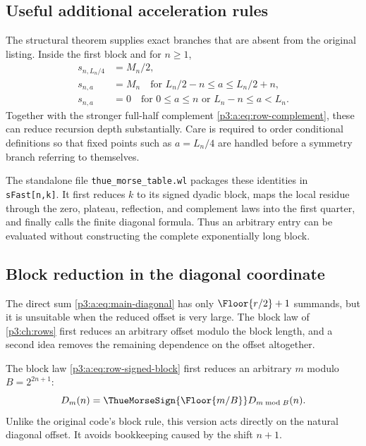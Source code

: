 \documentclass[11pt,oneside]{article}
\numberwithin{equation}{section}
\theoremstyle{definition}
\theoremstyle{remark}
\begin{document}
\subsection{Useful additional acceleration rules}

The structural theorem supplies exact branches that are absent from the
original listing.  Inside the first block and for \(n\ge1\),
\begin{align}
 s_{n,L_n/4}&=M_n/2,
 \label{p3:a:eq:wl-quarter-rule}\\
 s_{n,a}&=M_n
 \quad\text{for }L_n/2-n\le a\le L_n/2+n,
 \label{p3:a:eq:wl-plateau-rule}\\
 s_{n,a}&=0
 \quad\text{for }0\le a\le n
 \text{ or }L_n-n\le a<L_n.
 \label{p3:a:eq:wl-zero-rule}
\end{align}
Together with the stronger full-half complement
\eqref{p3:a:eq:row-complement}, these can reduce recursion depth substantially.
Care is required to order conditional definitions so that fixed points such as
\(a=L_n/4\) are handled before a symmetry branch referring to themselves.

The standalone file \texttt{thue\_morse\_table.wl} packages these identities in
\texttt{sFast[n,k]}.  It first reduces \(k\) to its signed dyadic block, maps the
local residue through the zero, plateau, reflection, and complement laws into the
first quarter, and finally calls the finite diagonal formula.  Thus an arbitrary
entry can be evaluated without constructing the complete exponentially long block.

\subsection{Block reduction in the diagonal coordinate}
The direct sum \eqref{p3:a:eq:main-diagonal} has only $\Floor{r/2}+1$
summands, but it is unsuitable when the reduced offset is very large. The
block law of \cref{p3:ch:rows} first reduces an arbitrary offset modulo the
block length, and a second idea removes the remaining dependence on the
offset altogether.

The block law \eqref{p3:a:eq:row-signed-block} first reduces an arbitrary $m$ modulo
$B=2^{2n+1}$:
\begin{equation}
 D_m(n)=\ThueMorseSign{\Floor{m/B}}D_{m\bmod B}(n).
 \label{p3:b:eq:diagonal-block-reduction}
\end{equation}
Unlike the original code's block rule, this version acts directly on the
natural diagonal offset.  It avoids bookkeeping caused by the shift $n+1$.
\end{document}
